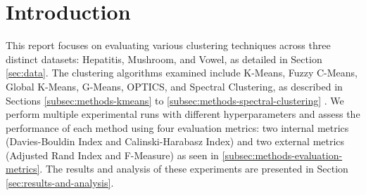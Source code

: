 \section{Introduction}
\label{sec:introduction}


This report focuses on evaluating various clustering techniques across three distinct datasets: Hepatitis, Mushroom, and Vowel, as detailed in Section \ref{sec:data}. The clustering algorithms examined include K-Means, Fuzzy C-Means, Global K-Means, G-Means, OPTICS, and Spectral Clustering, as described in Sections \ref{subsec:methods-kmeans} to \ref{subsec:methods-spectral-clustering} . We perform multiple experimental runs with different hyperparameters and assess the performance of each method using four evaluation metrics: two internal metrics (Davies-Bouldin Index and Calinski-Harabasz Index) and two external metrics (Adjusted Rand Index and F-Measure) as seen in \ref{subsec:methods-evaluation-metrics}. The results and analysis of these experiments are presented in Section \ref{sec:results-and-analysis}.
